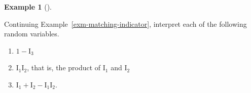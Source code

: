 \documentclass[
  letterpaper,
  DIV=11,
  numbers=noendperiod]{scrreprt}
\providecommand{\tightlist}{%
  \setlength{\itemsep}{0pt}\setlength{\parskip}{0pt}}
\theoremstyle{plain}
\theoremstyle{definition}
\newtheorem{example}{Example}[chapter]
\theoremstyle{definition}
\theoremstyle{definition}
\theoremstyle{remark}
\begin{document}
\begin{tcolorbox}[enhanced jigsaw, opacityback=0, left=2mm, colframe=quarto-callout-note-color-frame, toprule=.15mm, breakable, colback=white, leftrule=.75mm, arc=.35mm, rightrule=.15mm, bottomrule=.15mm]

\begin{example}[]\protect\hypertarget{exm-matching-indicator-properties}{}\label{exm-matching-indicator-properties}

Continuing Example~\ref{exm-matching-indicator}, interpret each of the
following random variables.

\begin{enumerate}
\def\labelenumi{\arabic{enumi}.}
\tightlist
\item
  \(1 - \textrm{I}_3\)
\item
  \(\textrm{I}_1 \textrm{I}_2\), that is, the product of
  \(\textrm{I}_1\) and \(\textrm{I}_2\)
\item
  \(\textrm{I}_1 + \textrm{I}_2 - \textrm{I}_1 \textrm{I}_2\).
\end{enumerate}

\end{example}

\end{tcolorbox}
\end{document}
